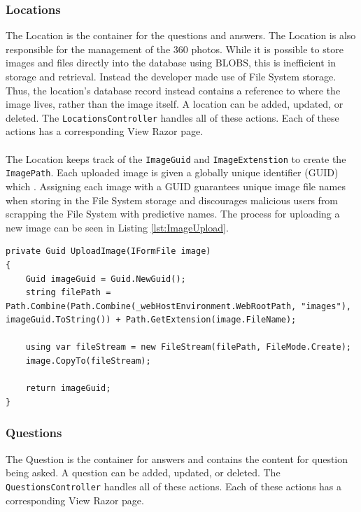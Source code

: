 \subsubsection{Locations}
The Location is the container for the questions and answers. The Location is also responsible for the management of the 360 photos. While it is possible to store images and files directly into the database using BLOBS, this is inefficient in storage and retrieval. Instead the developer made use of File System storage. Thus, the location's database record instead contains a reference to where the image lives, rather than the image itself. A location can be added, updated, or deleted. The \lstinline{LocationsController} handles all of these actions. Each of these actions has a corresponding View Razor page.\\
\\
The Location keeps track of the \lstinline{ImageGuid} and \lstinline{ImageExtenstion} to create the \lstinline{ImagePath}. Each uploaded image is given a globally unique identifier (GUID) which . Assigning each image with a GUID guarantees unique image file names when storing in the File System storage and discourages malicious users from scrapping the File System with predictive names. The process for uploading a new image can be seen in Listing \ref{lst:ImageUpload}.
\begin{lstlisting}[caption=Uploading an Image, label=lst:ImageUpload]
private Guid UploadImage(IFormFile image)
{
	Guid imageGuid = Guid.NewGuid();
	string filePath = Path.Combine(Path.Combine(_webHostEnvironment.WebRootPath, "images"), imageGuid.ToString()) + Path.GetExtension(image.FileName);
	
	using var fileStream = new FileStream(filePath, FileMode.Create);
	image.CopyTo(fileStream);
	
	return imageGuid;
}
\end{lstlisting} 

\subsubsection{Questions}
The Question is the container for answers and contains the content for question being asked. A question can be added, updated, or deleted. The \lstinline{QuestionsController} handles all of these actions. Each of these actions has a corresponding View Razor page. 

